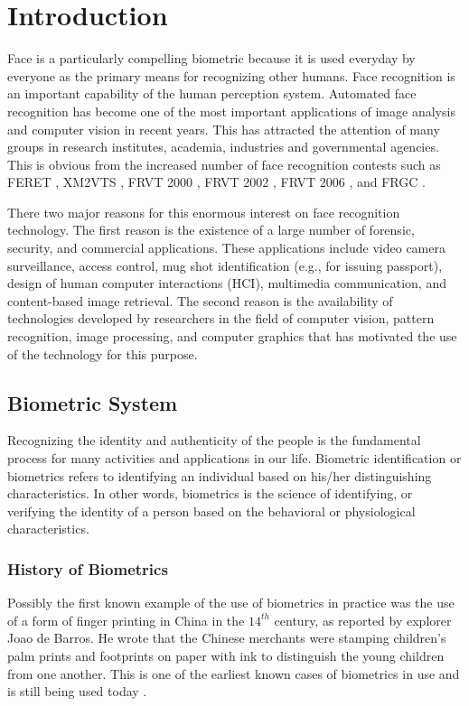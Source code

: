 \chapter{Introduction}
Face is a particularly compelling biometric because it is used
everyday by everyone as the primary means for recognizing other
humans. Face recognition is an important capability of the human
perception system. Automated face recognition has become one of the
most important applications of image analysis and computer vision in
recent years. This has attracted the attention of many groups in
research institutes, academia, industries and governmental agencies.
This is obvious from the increased number of face recognition
contests such as FERET \cite{FERET2000}, XM2VTS \cite{Messer99},
FRVT 2000 \cite{FRVT2000}, FRVT 2002 \cite{FRVT2002}, FRVT 2006
\cite{FRVT2006}, and FRGC \cite{FRGC2005}.

There two major reasons for this enormous interest on face
recognition technology. The first reason is the existence of a large
number of forensic, security, and commercial applications. These
applications include video camera surveillance, access control, mug
shot identification (e.g., for issuing passport), design of human
computer interactions (HCI), multimedia communication, and
content-based image retrieval. The second reason is the availability
of technologies developed by researchers in the field of computer
vision, pattern recognition, image processing, and computer graphics
that has motivated the use of the technology for this purpose.

\section{Biometric System}
Recognizing the identity and authenticity of the people is the
fundamental process for many activities and applications in our
life. Biometric identification or biometrics refers to identifying
an individual based on his/her distinguishing characteristics. In
other words, biometrics is the science of identifying, or verifying
the identity of a person based on the behavioral or physiological
characteristics.

\subsection{History of Biometrics}
Possibly the first known example of the use of biometrics in
practice was the use of a form of finger printing in China in the
$14^{th}$ century, as reported by explorer Joao de Barros. He wrote
that the Chinese merchants were stamping children's palm prints and
footprints on paper with ink to distinguish the young children from
one another. This is one of the earliest known cases of biometrics
in use and is still being used today \cite{Garfinkel2000}.

